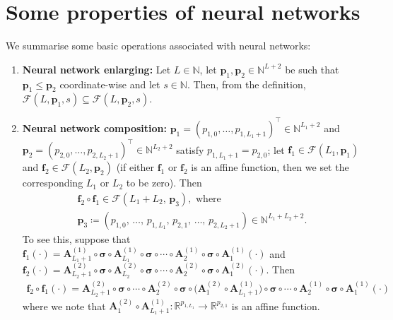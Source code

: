 \documentclass[12pt]{article}
\begin{document}
\section{Some properties of neural networks} \label{appendix-a}
We summarise some basic operations associated with neural networks:
\begin{enumerate}[label=(P\arabic*)]
    \item \label{NN-enlarging} \textbf{Neural network enlarging:} Let $L\in\mathbb{N}$, let $\bm p_1, \bm p_2 \in \mathbb{N}^{L+2}$ be such that $\bm p_1 \leq \bm p_2$ coordinate-wise and let $s\in\mathbb{N}$. Then, from the definition, $\mathcal{F}(L,\bm p_1, s) \subseteq \mathcal{F}(L,\bm p_2, s)$.

    \item \label{NN-composition} \textbf{Neural network composition:} $\bm p_1 = (p_{1,0},\ldots,p_{1,L_1+1})^\top \in \mathbb{N}^{L_1+2}$ and $\bm p_2 = (p_{2,0},\ldots,p_{2,L_2+1})^\top \in \mathbb{N}^{L_2+2}$ satisfy $p_{1,L_1+1} = p_{2,0}$; let $\bm f_1 \in\mathcal{F}(L_1,\bm p_1)$ and $\bm f_2 \in\mathcal{F}(L_2,\bm p_2)$ (if either $\bm f_1$ or $\bm f_2$ is an affine function, then we set the corresponding $L_1$ or $L_2$ to be zero). Then
    \begin{gather*}
        \bm f_2 \circ \bm f_1 \in \mathcal{F}(L_1+L_2,\, \bm p_3),\text{ where}\\
        \bm p_3 \coloneqq (p_{1,0},\, \ldots,\, p_{1,L_1},\, p_{2,1},\, \ldots,\, p_{2,L_2+1}) \in \mathbb{N}^{L_1+L_2+2}. 
    \end{gather*}
    To see this, suppose that $\bm f_1(\cdot) = \bm{A}_{L_1+1}^{(1)} \circ \bm{\sigma} \circ \bm{A}_{L_1}^{(1)} \circ \bm{\sigma} \circ \cdots \circ \bm{A}_2^{(1)} \circ \bm{\sigma} \circ \bm{A}_1^{(1)}(\cdot)$ and $\bm f_2(\cdot) = \bm{A}_{L_2+1}^{(2)} \circ \bm{\sigma} \circ \bm{A}_{L_2}^{(2)} \circ \bm{\sigma} \circ \cdots \circ \bm{A}_2^{(2)} \circ \bm{\sigma} \circ \bm{A}_1^{(2)}(\cdot)$.  Then
    \begin{align*}
        \bm f_2 \circ \bm f_1 (\cdot) = \bm{A}_{L_2+1}^{(2)} \circ \bm{\sigma} \circ \cdots \circ \bm{A}_2^{(2)} \circ \bm{\sigma} \circ \bigl(\bm{A}_1^{(2)} \circ \bm{A}_{L_1+1}^{(1)}\bigr) \circ \bm{\sigma} \circ \cdots \circ \bm{A}_2^{(1)} \circ \bm{\sigma} \circ \bm{A}_1^{(1)}(\cdot)
    \end{align*}
    where we note that $\bm{A}_1^{(2)} \circ \bm{A}_{L_1+1}^{(1)}: \mathbb{R}^{p_{1,L_1}} \to \mathbb{R}^{p_{2,1}}$ is an affine function. 


\end{enumerate}
\end{document}
